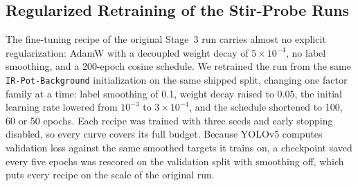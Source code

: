 ﻿\documentclass[journal]{IEEEtran}
\begin{document}
\subsection{Regularized Retraining of the Stir-Probe Runs}
\label{sec:stir-reg}
The fine-tuning recipe of the original Stage~3 run carries almost no explicit regularization: AdamW with a decoupled weight decay of $5 \times 10^{-4}$, no label smoothing, and a 200-epoch cosine schedule. We retrained the run from the same \texttt{IR-Pot-Background} initialization on the same shipped split, changing one factor family at a time: label smoothing of 0.1, weight decay raised to 0.05, the initial learning rate lowered from $10^{-3}$ to $3 \times 10^{-4}$, and the schedule shortened to 100, 60 or 50 epochs. Each recipe was trained with three seeds and early stopping disabled, so every curve covers its full budget. Because YOLOv5 computes validation loss against the same smoothed targets it trains on, a checkpoint saved every five epochs was rescored on the validation split with smoothing off, which puts every recipe on the scale of the original run.
\end{document}
